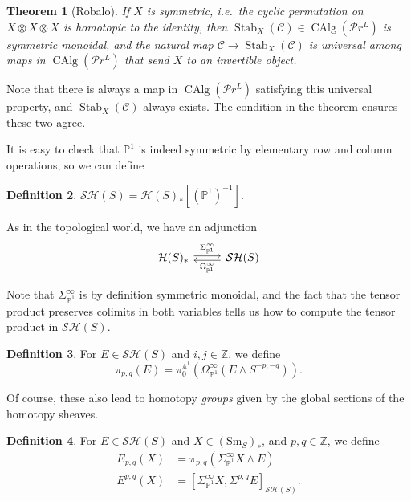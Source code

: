 \documentclass{shortart}
\newtheorem{thm}{Theorem}[section]
\theoremstyle{definition}
\newtheorem{defi}[thm]{Definition}
\newcommand\Sm{\mathrm{Sm}}
\newcommand\SH{\mathcal{SH}}
\renewcommand\H{\mathcal{H}}
\renewcommand\P{\mathbb{P}}
\newcommand\A{\mathbb{A}}
\newcommand\Z{\mathbb{Z}}
\newcommand\PrL{\mathcal{P}r^L}
\DeclareMathOperator\CAlg{CAlg}
\DeclareMathOperator\Stab{Stab}
\begin{document}
\begin{thm}[Robalo]
  If $X$ is \emph{symmetric}, i.e.\ the cyclic permutation on $X \otimes X \otimes X$ is homotopic to the identity, then $\Stab_X(\mathcal{C}) \in \CAlg(\PrL)$ is symmetric monoidal, and the natural map $\mathcal{C} \to \Stab_X(\mathcal{C})$ is universal among maps in $\CAlg(\PrL)$ that send $X$ to an invertible object.
\end{thm}

Note that there is always a map in $\CAlg(\PrL)$ satisfying this universal property, and $\Stab_X(\mathcal{C})$ always exists. The condition in the theorem ensures these two agree.

It is easy to check that $\P^1$ is indeed symmetric by elementary row and column operations, so we can define
\begin{defi}
  $\SH(S) = \H(S)_*[(\P^1)^{-1}]$.
\end{defi}

As in the topological world, we have an adjunction
\[
  \begin{tikzcd}
    \H(S)_* \ar[r, yshift = 2, "\Sigma^\infty_{\P^1}"] & \SH(S) \ar[l, yshift=-2, "\Omega^\infty_{\P^1}"]
  \end{tikzcd}
\]

Note that $\Sigma^\infty_{\P^1}$ is by definition symmetric monoidal, and the fact that the tensor product preserves colimits in both variables tells us how to compute the tensor product in $\SH(S)$.

\begin{defi}
  For $E \in \SH(S)$ and $i, j \in \Z$, we define
  \[
    \pi_{p, q}(E) = \pi_0^{\A^1}(\Omega^\infty_{\P^1}(E \wedge S^{-p, -q})).
  \]
\end{defi}

Of course, these also lead to homotopy \emph{groups} given by the global sections of the homotopy sheaves.

\begin{defi}
  For $E \in \SH(S)$ and $X \in (\Sm_S)_*$, and $p, q \in \Z$, we define
  \[
    \begin{aligned}
      E_{p, q}(X) &= \pi_{p, q}(\Sigma^\infty_{\P^1} X \wedge E)\\
      E^{p, q}(X) &= [\Sigma^\infty_{\P^1} X, \Sigma^{p, q} E]_{\SH(S)}.
    \end{aligned}
  \]
\end{defi}
\end{document}
